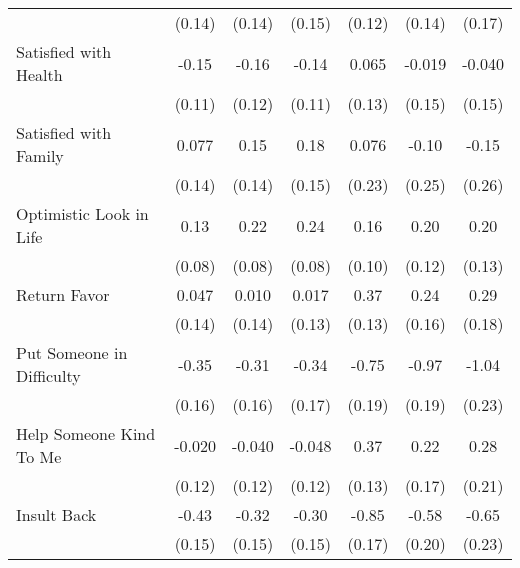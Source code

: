 {\begin{tabular}{l*{6}{c}}
            &      (0.14)         &      (0.14)         &      (0.15)         &      (0.12)         &      (0.14)         &      (0.17)         \\
\addlinespace
Satisfied with Health&       -0.15         &       -0.16         &       -0.14         &       0.065         &      -0.019         &      -0.040         \\
            &      (0.11)         &      (0.12)         &      (0.11)         &      (0.13)         &      (0.15)         &      (0.15)         \\
\addlinespace
Satisfied with Family&       0.077         &        0.15         &        0.18         &       0.076         &       -0.10         &       -0.15         \\
            &      (0.14)         &      (0.14)         &      (0.15)         &      (0.23)         &      (0.25)         &      (0.26)         \\
\addlinespace
Optimistic Look in Life&        0.13         &        0.22\sym{**} &        0.24\sym{**} &        0.16         &        0.20         &        0.20         \\
            &      (0.08)         &      (0.08)         &      (0.08)         &      (0.10)         &      (0.12)         &      (0.13)         \\
\addlinespace
Return Favor&       0.047         &       0.010         &       0.017         &        0.37\sym{**} &        0.24         &        0.29         \\
            &      (0.14)         &      (0.14)         &      (0.13)         &      (0.13)         &      (0.16)         &      (0.18)         \\
\addlinespace
Put Someone in Difficulty&       -0.35\sym{*}  &       -0.31         &       -0.34\sym{*}  &       -0.75\sym{***}&       -0.97\sym{***}&       -1.04\sym{***}\\
            &      (0.16)         &      (0.16)         &      (0.17)         &      (0.19)         &      (0.19)         &      (0.23)         \\
\addlinespace
Help Someone Kind To Me&      -0.020         &      -0.040         &      -0.048         &        0.37\sym{**} &        0.22         &        0.28         \\
            &      (0.12)         &      (0.12)         &      (0.12)         &      (0.13)         &      (0.17)         &      (0.21)         \\
\addlinespace
Insult Back &       -0.43\sym{**} &       -0.32\sym{*}  &       -0.30\sym{*}  &       -0.85\sym{***}&       -0.58\sym{**} &       -0.65\sym{**} \\
            &      (0.15)         &      (0.15)         &      (0.15)         &      (0.17)         &      (0.20)         &      (0.23)         \\
\bottomrule
\end{tabular}
}
